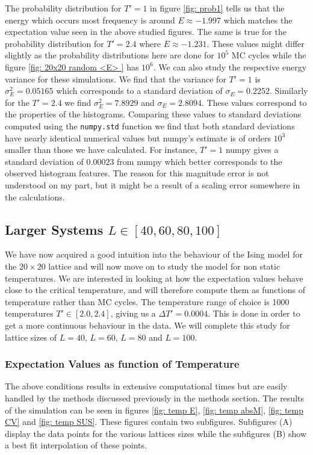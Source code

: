 \documentclass[a4paper, 10pt, reqno]{amsart}
\begin{document}
The probability distribution for $T' = 1$ in figure \ref{fig: prob1} tells us that the energy which occurs most frequency is around $E \approx -1.997$ which matches the expectation value seen in the above studied figures. The same is true for the probability distribution for $T' = 2.4$ where $E \approx -1.231$. These values might differ slightly as the probability distributions here are done for $10^5$ MC cycles while the figure \ref{fig: 20x20 random <E> } has $10^6$. We can also study the respective energy variance for these simulations. We find that the variance for $T' = 1$ is $\sigma^2_E = 0.05165$ which corresponds to a standard deviation of $\sigma_E = 0.2252$. Similarly for the $T' = 2.4$ we find $\sigma^2_E = 7.8929$ and $\sigma_E = 2.8094$. These values correspond to the properties of the histograms. Comparing these values to standard deviations computed using the  \texttt{numpy.std} function we find that both standard deviations have nearly identical numerical values but numpy's estimate is of orders $10^3$ smaller than those we have calculated. For instance, $T' = 1$ numpy gives a standard deviation of $0.00023$ from numpy which better corresponds to the observed histogram features. The reason for this magnitude error is not understood on my part, but it might be a result of a scaling error somewhere in the calculations.

\subsection{Larger Systems $L \in [40,60,80,100]$}
We have now acquired a good intuition into the behaviour of the Ising model for the $20 \times 20$ lattice and will now move on to study the model for non static temperatures. We are interested in looking at how the expectation values behave close to the critical temperature, and will therefore compute them as functions of temperature rather than MC cycles. The temperature range of choice is 1000 temperatures $T' \in [2.0,2.4]$, giving us a $\Delta T' = 0.0004$. This is done in order to get a more continuous behaviour in the data. We will complete this study for lattice sizes of $L = 40$, $L = 60$, $L = 80$ and $L = 100$. 
\subsubsection{Expectation Values as function of Temperature}
The above conditions results in extensive computational times but are easily handled by the methods discussed previously in the methods section. The results of the simulation can be seen in figures \ref{fig: temp E}, \ref{fig: temp absM}, \ref{fig: temp CV} and \ref{fig: temp SUS}. These figures contain two subfigures. Subfigures (A) display the data points  for the various lattices sizes while the subfigures (B) show a best fit interpolation of these points. 
\end{document}
